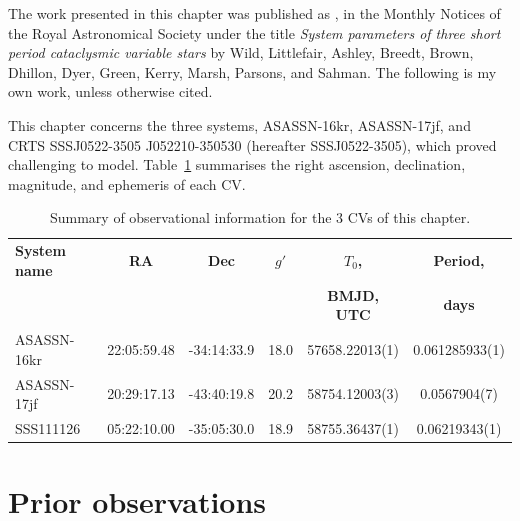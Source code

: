 \label{chpt:results:three peculiar white dwarfs} %


The work presented in this chapter was published as \cite{wild2021}, in the Monthly Notices of the Royal Astronomical Society under the title \textit{System parameters of three short period cataclysmic variable stars} by Wild, Littlefair, Ashley, Breedt, Brown, Dhillon, Dyer, Green, Kerry, Marsh, Parsons, and Sahman.
The following is my own work, unless otherwise cited.

This chapter concerns the three systems, ASASSN-16kr, ASASSN-17jf, and CRTS SSSJ0522-3505 J052210-350530 (hereafter SSSJ0522-3505), which proved challenging to model.
Table~\ref{table:three white dwarfs:observational data} summarises the right ascension, declination, magnitude, and ephemeris of each CV.

    \begin{table}
        \centering
        \caption{Summary of observational information for the 3 CVs of this chapter. }
        \label{table:three white dwarfs:observational data}
        \begin{tabular}{lccccc}
            \hline
            {\bf System name} & {\bf RA} & {\bf Dec} & {\bf $g'$}      & {\bf $T_0$,}    & {\bf Period,} \\
                              &          &           &                 & {\bf BMJD, UTC} & {\bf days}      \\
            \hline
            \hline
            ASASSN-16kr     & 22:05:59.48 & -34:14:33.9 & 18.0 & 57658.22013(1) & 0.061285933(1) \\
            ASASSN-17jf     & 20:29:17.13 & -43:40:19.8 & 20.2 & 58754.12003(3) & 0.0567904(7) \\
            SSS111126       & 05:22:10.00 & -35:05:30.0 & 18.9 & 58755.36437(1) & 0.06219343(1) \\
            \hline
        \end{tabular}
    \end{table}

\section{Prior observations}
\label{sect:three white dwarfs:prior observations}

